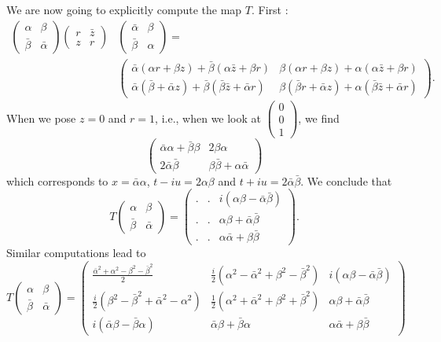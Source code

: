 We are now going to explicitly compute the map $T$. First :
\[ 
 \begin{split}
\begin{pmatrix}
\alpha&\beta\\
 \bar\beta&\bar \alpha
\end{pmatrix}
\begin{pmatrix}
r&\bar z\\
z&r
\end{pmatrix}
&
\begin{pmatrix}
\bar\alpha&\beta\\
\bar\beta&\alpha
\end{pmatrix}=\\
&\begin{pmatrix}
\bar\alpha(\alpha r+\beta z)+\bar\beta(\alpha\bar z+\beta r)& \beta(\alpha r+\beta z)+\alpha(\alpha\bar z+\beta r)\\
\bar\alpha(\bar\beta+\bar\alpha z)+\bar\beta(\bar\beta\bar z+\bar\alpha r)&\beta(\bar\beta r+\bar\alpha z)+\alpha(\bar\beta\bar z+\bar\alpha r)
\end{pmatrix}.
\end{split} 
\]
When we pose $z=0$ and $r=1$, i.e., when we look at $\begin{pmatrix}
0\\0\\1
\end{pmatrix}$, we find
\[ 
  \begin{pmatrix}
\bar\alpha\alpha+\bar\beta\beta&2\beta\alpha\\
2\bar\alpha\bar\beta& \beta\bar\beta+\alpha\bar\alpha
\end{pmatrix}
\]
which corresponds to $x=\bar\alpha\alpha$, $t-iu=2\alpha\beta$ and $t+iu=2\bar\alpha\bar\beta$. We conclude that
\[ 
  T\begin{pmatrix}
\alpha&\beta\\\bar\beta&\bar\alpha
\end{pmatrix}
=
\begin{pmatrix}
.&.&i(\alpha\beta-\bar\alpha\bar\beta)\\
.&.&\alpha\beta+\bar\alpha\bar\beta\\
.&.&\alpha\bar\alpha+\beta\bar\beta
\end{pmatrix}.
\]
Similar computations lead to
\begin{equation}
T\begin{pmatrix}
\alpha&\beta\\
\bar\beta&\bar\alpha
\end{pmatrix}
=
\begin{pmatrix}
\frac{ \bar\alpha^2+\alpha^2-\beta^2-\bar\beta^2 }{2} &     \frac{ i }{2}(\alpha^2-\bar\alpha^2+\beta^2-\bar\beta^2) &  i(\alpha\beta-\bar\alpha\bar\beta)\\
\frac{ i }{2}(\beta^2-\bar\beta^2+\bar\alpha^2-\alpha^2) &  \frac{ 1 }{2}(\alpha^2+\bar\alpha^2+\beta^2+\bar\beta^2) &  \alpha\beta+\bar\alpha\bar\beta\\
i(\bar\alpha\beta-\bar\beta\alpha)          &   \bar\alpha\beta+\bar\beta\alpha             &   \alpha\bar\alpha+\beta\bar\beta
\end{pmatrix}
\end{equation}

